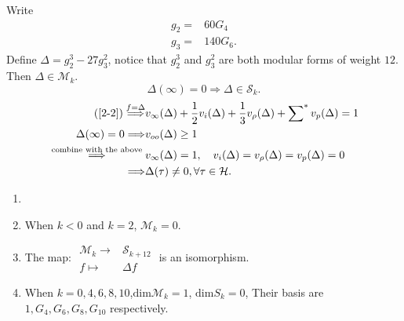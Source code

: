 Write
\begin{align*}
  g_2=&60G_4\\
  g_3=&140 G_6
.\end{align*}
Define $\Delta=g_2^{3}-27g_3^2$, notice that $g_2^3$ and $g_3^2$ are both modular forms of weight $12$. Then $\Delta\in \mathcal{M}_k$. 
\[
  \Delta(\infty)=0\Rightarrow \Delta\in \mathcal{S}_k.
\] 
\begin{align*}
  (\ref{2-2})\overset{f=\Delta}{\Longrightarrow}&v_{\infty}(\Delta)+\frac{1}{2}v_i(\Delta)+\frac{1}{3}v_{\rho}(\Delta)+\sum\nolimits^{*}v_p(\Delta)=1\\
  \Delta(\infty)=0\Longrightarrow & v_{oo}(\Delta)\ge 1\\
  \overset{\text{ combine with the above }}{\Longrightarrow} & v_{\infty}(\Delta)=1,\quad v_i(\Delta)=v_\rho(\Delta)=v_p(\Delta)=0\\
  \Longrightarrow & \Delta(\tau)\neq 0, \forall \tau \in \mathcal{H}
.\end{align*} 
\begin{theorem}
  \begin{enumerate}
    \item []
    \item When $k<0$ and $k=2$, $\mathcal{M}_k=0$.
    \item The map: $\begin{matrix} \mathcal{M}_k \to &\mathcal{S}_{k+12}\\f\mapsto& \Delta f \end{matrix} $ is an isomorphism.
    \item When $k=0,4,6,8,10$,$\mathrm{dim}\mathcal{M}_k=1$, $\mathrm{dim}S_k=0$, Their basis are $1,G_4,G_6,G_8,G_{10}$ respectively.
  \end{enumerate}
\end{theorem}
